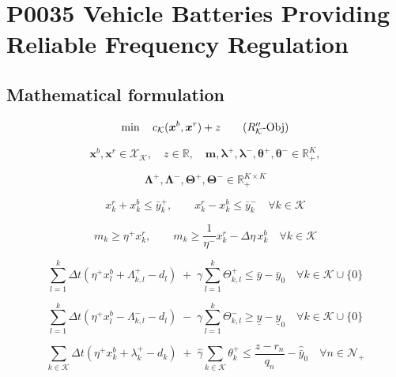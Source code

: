 \documentclass[10pt]{article}
\begin{document}
\section*{P0035 Vehicle Batteries Providing Reliable Frequency Regulation}
\subsection*{Mathematical formulation}
\begin{equation}
\min \quad c_{\mathcal K}(\boldsymbol{x}^b,\boldsymbol{x}^r) + z
\tag{$R''_{\mathcal K}$-Obj}
\end{equation}

\begin{equation}
\boldsymbol{x}^b,\boldsymbol{x}^r \in \mathcal{X}_{\mathcal K},\quad
z \in \mathbb{R},\quad
\boldsymbol{m},\boldsymbol{\lambda}^+,\boldsymbol{\lambda}^-,
\boldsymbol{\theta}^+,\boldsymbol{\theta}^- \in \mathbb{R}_+^K,
\tag{LP-a}
\end{equation}

\begin{equation}
\boldsymbol{\Lambda}^+,\boldsymbol{\Lambda}^-,
\boldsymbol{\Theta}^+,\boldsymbol{\Theta}^- \in \mathbb{R}_+^{K \times K}
\tag{LP-b}
\end{equation}

\begin{equation}
x_k^r + x_k^b \le \bar y_k^+,\qquad
x_k^r - x_k^b \le \bar y_k^-
\quad \forall k \in \mathcal K
\tag{27}
\end{equation}

\begin{equation}
m_k \ge \eta^+ x_k^r,\qquad
m_k \ge \frac{1}{\eta^-}x_k^r - \Delta\eta\,x_k^b
\quad \forall k \in \mathcal K
\tag{28}
\end{equation}

\begin{equation}
\sum_{l=1}^{k} \Delta t \left( \eta^+x_l^b + \Lambda_{k,l}^+ - d_l \right)
\;+\; \gamma \sum_{l=1}^{k} \Theta_{k,l}^+
\le \bar y - \bar y_0
\quad \forall k \in \mathcal K \cup \{0\}
\tag{29}
\end{equation}

\begin{equation}
\sum_{l=1}^{k} \Delta t \left( \eta^+x_l^b - \Lambda_{k,l}^- - d_l \right)
\;-\; \gamma \sum_{l=1}^{k} \Theta_{k,l}^-
\ge \underline y - \underline y_0
\quad \forall k \in \mathcal K \cup \{0\}
\tag{30}
\end{equation}

\begin{equation}
\sum_{k \in \mathcal K} \Delta t \left( \eta^+x_k^b + \lambda_k^+ - d_k \right)
\;+\; \hat{\gamma}\sum_{k \in \mathcal K}\theta_k^+
\le \frac{z - r_n}{q_n} - \hat{\bar y}_0
\quad \forall n \in \mathcal N_+
\tag{31}
\end{equation}
\end{document}
